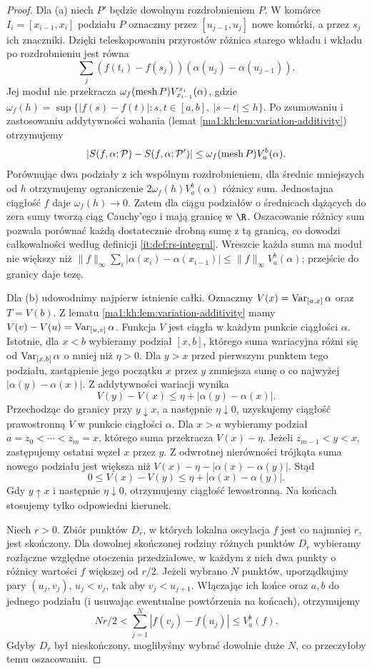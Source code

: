 \begin{proof}
Dla (a) niech $P'$ będzie dowolnym rozdrobnieniem $P$.
W komórce $I_i=[x_{i-1},x_i]$ podziału $P$ oznaczmy
przez $[u_{j-1},u_j]$ nowe komórki, a przez $s_j$ ich
znaczniki. Dzięki teleskopowaniu przyrostów różnica
starego wkładu i wkładu po rozdrobnieniu jest równa
\[
 \sum_j(f(t_i)-f(s_j))(\alpha(u_j)-\alpha(u_{j-1})).
\]
Jej moduł nie przekracza
$\omega_f(\operatorname{mesh} P)V_{x_{i-1}}^{x_i}(\alpha)$, gdzie
$\omega_f(h)=\sup\{|f(s)-f(t)|:s,t\in[a,b],\ |s-t|\le h\}$.
Po zsumowaniu i zastosowaniu addytywności wahania
(lemat \ref{ma1:kh:lem:variation-additivity}) otrzymujemy
\[
 |S(f,\alpha;\mathcal P)-S(f,\alpha;\mathcal P')|
 \le\omega_f(\operatorname{mesh} P)V_a^b(\alpha).
\]
Porównując dwa podziały z ich wspólnym rozdrobnieniem,
dla średnic mniejszych od $h$ otrzymujemy ograniczenie
$2\omega_f(h)V_a^b(\alpha)$ różnicy sum.
Jednostajna ciągłość $f$ daje $\omega_f(h)\to0$.
Zatem dla ciągu podziałów o średnicach dążących do zera
sumy tworzą ciąg Cauchy'ego i mają granicę w $\R$.
Oszacowanie różnicy sum pozwala porównać każdą
dostatecznie drobną sumę z tą granicą, co dowodzi
całkowalności według definicji \ref{it:def:rs-integral}.
Wreszcie każda suma ma moduł nie większy niż
$\|f\|_\infty\sum_i|\alpha(x_i)-\alpha(x_{i-1})|
\le\|f\|_\infty V_a^b(\alpha)$; przejście do granicy daje tezę.

Dla (b) udowodnimy najpierw istnienie całki. Oznaczmy $V(x)=\operatorname{Var}_{[a,x]}\alpha$ oraz $T=V(b)$. Z lematu \ref{ma1:kh:lem:variation-additivity} mamy $V(v)-V(u)=\operatorname{Var}_{[u,v]}\alpha$. Funkcja $V$ jest ciągła w każdym punkcie ciągłości $\alpha$. Istotnie, dla $x<b$ wybieramy podział $[x,b]$, którego suma wariacyjna różni się od $\operatorname{Var}_{[x,b]}\alpha$ o mniej niż $\eta>0$. Dla $y>x$ przed pierwszym punktem tego podziału, zastąpienie jego początku $x$ przez $y$ zmniejsza sumę o co najwyżej $|\alpha(y)-\alpha(x)|$. Z addytywności wariacji wynika
\[
 V(y)-V(x)\le\eta+|\alpha(y)-\alpha(x)|.
\]
Przechodząc do granicy przy $y\downarrow x$, a następnie $\eta\downarrow0$, uzyskujemy ciągłość prawostronną $V$ w punkcie ciągłości $\alpha$.
Dla $x>a$ wybieramy podział $a=z_0<\cdots<z_m=x$,
którego suma przekracza $V(x)-\eta$.
Jeżeli $z_{m-1}<y<x$, zastępujemy ostatni węzeł $x$
przez $y$. Z odwrotnej nierówności trójkąta suma
nowego podziału jest większa niż
$V(x)-\eta-|\alpha(x)-\alpha(y)|$. Stąd
\[
 0\le V(x)-V(y)\le\eta+|\alpha(x)-\alpha(y)|.
\]
Gdy $y\uparrow x$ i następnie $\eta\downarrow0$,
otrzymujemy ciągłość lewostronną. Na końcach
stosujemy tylko odpowiedni kierunek.

Niech $r>0$. Zbiór punktów $D_r$, w których lokalna oscylacja $f$ jest co najmniej $r$, jest skończony. Dla dowolnej skończonej rodziny różnych punktów $D_r$ wybieramy rozłączne względne otoczenia przedziałowe, w każdym z nich dwa punkty o różnicy wartości $f$ większej od $r/2$. Jeżeli wybrano $N$ punktów, uporządkujmy pary
$(u_j,v_j)$, $u_j<v_j$, tak aby $v_j<u_{j+1}$.
Włączając ich końce oraz $a,b$ do jednego podziału
(i usuwając ewentualne powtórzenia na końcach),
otrzymujemy
\[
 Nr/2<\sum_{j=1}^N|f(v_j)-f(u_j)|\le V_a^b(f).
\]
Gdyby $D_r$ był nieskończony, moglibyśmy wybrać
dowolnie duże $N$, co przeczyłoby temu oszacowaniu.


\end{proof}
